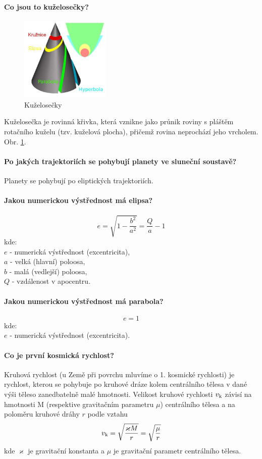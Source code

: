 \documentclass[11pt,a4paper,notitlepage,twocolumn]{article}
\begin{document}
\paragraph{Co jsou to kuželosečky?}
\begin{figure}[H]
\includegraphics[width=0.38\textwidth]{kuzelosecky}
\caption{Kuželosečky}
\label{fig:kuzelosecky}
\end{figure}
Kuželosečka je rovinná křivka, která vznikne jako průnik roviny s pláštěm rotačního kuželu
(tzv. kuželová plocha), přičemž rovina neprochází jeho vrcholem. Obr. \ref{fig:kuzelosecky}.
\paragraph{Po jakých trajektoriích se pohybují planety ve sluneční soustavě?}
Planety se pohybují po eliptických trajektoriích.
\paragraph{Jakou numerickou výstřednost má elipsa?}
\[ e = \sqrt{1-\frac{b^2}{a^2}} = \frac{Q}{a} - 1 \]
kde:\\
$ e $ - numerická výstřednost (excentricita),\\
$ a $ - velká (hlavní) poloosa,\\
$ b $ - malá (vedlejší) poloosa,\\
$ Q $ - vzdálenost v apocentru.

\paragraph{Jakou numerickou výstřednost má parabola?}
\[ e = 1 \]
kde:\\
$ e $ - numerická výstřednost (excentricita).

\paragraph{Co je první kosmická rychlost?}
Kruhová rychlost (u Země při povrchu mluvíme o 1. kosmické rychlosti) je rychlost, 
kterou se pohybuje po kruhové dráze kolem centrálního tělesa v dané výši těleso 
zanedbatelně malé hmotnosti.
Velikost kruhové rychlosti $  v_{\rm k} $ závisí na hmotnosti M (respektive gravitačním parametru $ \mu $)
centrálního tělesa a na poloměru kruhové dráhy $ r $ podle vztahu
\[ v_{\rm k} = \sqrt \frac{ \varkappa M }{r} = \sqrt \frac{\mu}{r} \]
kde $ \varkappa $ je gravitační konstanta a $ \mu $ je gravitační parametr centrálního tělesa.
\end{document}
